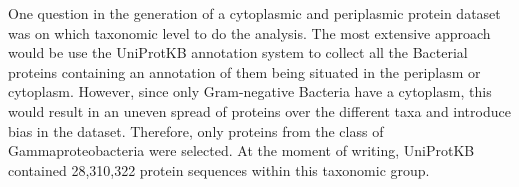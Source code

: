 One question in the generation of a cytoplasmic and periplasmic protein dataset was on which taxonomic level to do the analysis. 
The most extensive approach would be use the UniProtKB annotation system to collect all the Bacterial proteins containing an  annotation of them being situated in the periplasm or cytoplasm.
However, since only Gram-negative Bacteria have a cytoplasm,
this would result in an uneven spread of proteins over the different taxa and introduce bias in the dataset.
Therefore,  only proteins from the class of Gammaproteobacteria were selected.
At the moment of writing, UniProtKB contained 28,310,322 protein sequences within this taxonomic group.
